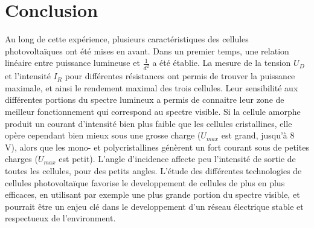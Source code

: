 \section{Conclusion}

Au long de cette expérience, plusieurs caractéristiques des cellules photovoltaïques ont été mises en avant.
Dans un premier temps, une relation linéaire entre puissance lumineuse et \(\frac{1}{d^2}\) a été établie. La mesure de la tension \(U_D\) et l'intensité \(I_R\) pour différentes résistances ont permis de trouver la puissance maximale, et ainsi le rendement maximal des trois cellules. Leur sensibilité aux différentes portions du spectre lumineux a permis de connaitre leur zone de meilleur fonctionnement qui correspond au spectre visible.
Si la cellule amorphe produit un courant d'intensité bien plus faible que les cellules cristallines, elle opère cependant bien mieux sous une grosse charge (\(U_{max}\) est grand, jusqu'à \(8\) \unit{\volt}), alors que les mono- et polycristallines génèrent un fort courant sous de petites charges (\(U_{max}\) est petit).
L'angle d'incidence affecte peu l'intensité de sortie de toutes les cellules, pour des petits angles.
L'étude des différentes technologies de cellules photovoltaïque favorise le developpement de cellules de plus en plus efficaces, en utilisant par exemple une plus grande portion du spectre visible, et pourrait être un enjeu clé dans le developpement d'un réseau électrique stable et respectueux de l'environment.


